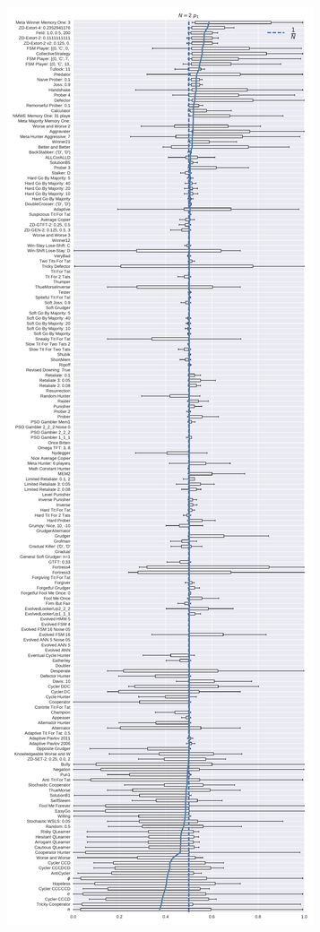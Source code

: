 \documentclass{article}
\begin{document}
\begin{figure}[!hbtp]
    \centering
    \begin{subfigure}[t]{.3\textwidth}
        \centering
        \includegraphics[width=\textwidth]{../img/boxplot_2_invade.pdf}

\end{subfigure}
\end{figure}
\end{document}

